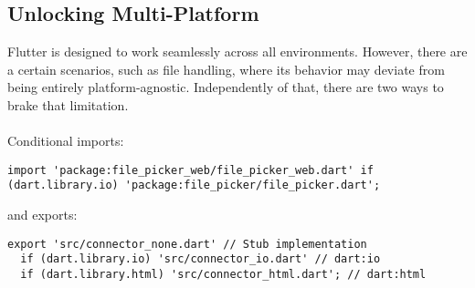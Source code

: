 
\subsection{Unlocking Multi-Platform}

Flutter is designed to work seamlessly across all environments. However, there are a certain scenarios, such as file
handling, where its behavior may deviate from being entirely platform-agnostic. Independently of that, there are two
ways to brake that limitation.\\
\\

\noindent Conditional imports:

\begin{lstlisting}
import 'package:file_picker_web/file_picker_web.dart' if (dart.library.io) 'package:file_picker/file_picker.dart';
\end{lstlisting}

\noindent and exports:

\begin{lstlisting}
export 'src/connector_none.dart' // Stub implementation
  if (dart.library.io) 'src/connector_io.dart' // dart:io
  if (dart.library.html) 'src/connector_html.dart'; // dart:html
\end{lstlisting}
